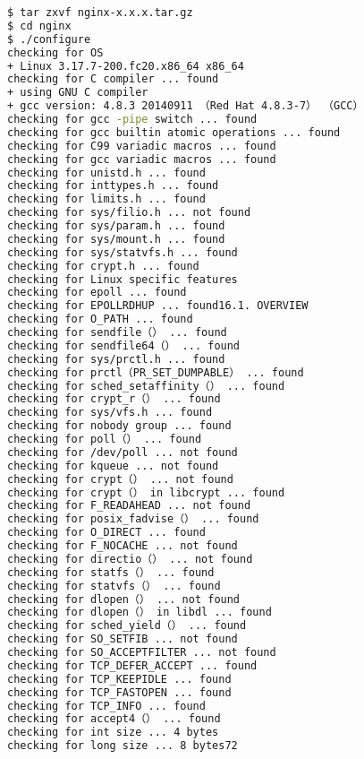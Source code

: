 \begin{lstlisting}[language=bash]
$ tar zxvf nginx-x.x.x.tar.gz
$ cd nginx
$ ./configure
checking for OS
+ Linux 3.17.7-200.fc20.x86_64 x86_64
checking for C compiler ... found
+ using GNU C compiler
+ gcc version: 4.8.3 20140911 （Red Hat 4.8.3-7） （GCC）
checking for gcc -pipe switch ... found
checking for gcc builtin atomic operations ... found
checking for C99 variadic macros ... found
checking for gcc variadic macros ... found
checking for unistd.h ... found
checking for inttypes.h ... found
checking for limits.h ... found
checking for sys/filio.h ... not found
checking for sys/param.h ... found
checking for sys/mount.h ... found
checking for sys/statvfs.h ... found
checking for crypt.h ... found
checking for Linux specific features
checking for epoll ... found
checking for EPOLLRDHUP ... found16.1. OVERVIEW
checking for O_PATH ... found
checking for sendfile（） ... found
checking for sendfile64（） ... found
checking for sys/prctl.h ... found
checking for prctl（PR_SET_DUMPABLE） ... found
checking for sched_setaffinity（） ... found
checking for crypt_r（） ... found
checking for sys/vfs.h ... found
checking for nobody group ... found
checking for poll（） ... found
checking for /dev/poll ... not found
checking for kqueue ... not found
checking for crypt（） ... not found
checking for crypt（） in libcrypt ... found
checking for F_READAHEAD ... not found
checking for posix_fadvise（） ... found
checking for O_DIRECT ... found
checking for F_NOCACHE ... not found
checking for directio（） ... not found
checking for statfs（） ... found
checking for statvfs（） ... found
checking for dlopen（） ... not found
checking for dlopen（） in libdl ... found
checking for sched_yield（） ... found
checking for SO_SETFIB ... not found
checking for SO_ACCEPTFILTER ... not found
checking for TCP_DEFER_ACCEPT ... found
checking for TCP_KEEPIDLE ... found
checking for TCP_FASTOPEN ... found
checking for TCP_INFO ... found
checking for accept4（） ... found
checking for int size ... 4 bytes
checking for long size ... 8 bytes72


\end{lstlisting}
